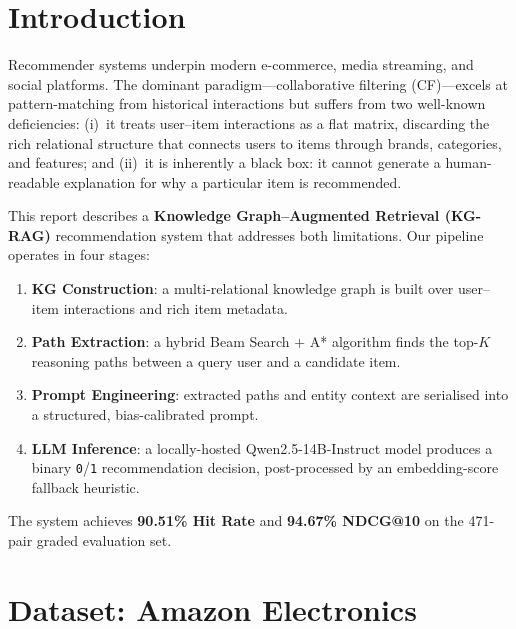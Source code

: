 \documentclass[12pt,a4paper]{article}
\begin{document}
\section{Introduction}

Recommender systems underpin modern e-commerce, media streaming, and social platforms.
The dominant paradigm---collaborative filtering (CF)---excels at pattern-matching from
historical interactions but suffers from two well-known deficiencies:
(i)~it treats user--item interactions as a flat matrix, discarding the rich relational
structure that connects users to items through brands, categories, and features; and
(ii)~it is inherently a black box: it cannot generate a human-readable explanation for
why a particular item is recommended.

This report describes a \textbf{Knowledge Graph--Augmented Retrieval (KG-RAG)}
recommendation system that addresses both limitations.
Our pipeline operates in four stages:

\begin{enumerate}[leftmargin=2em]
  \item \textbf{KG Construction}: a multi-relational knowledge graph is built over
        user--item interactions and rich item metadata.
  \item \textbf{Path Extraction}: a hybrid Beam Search $+$ A* algorithm finds the
        top-$K$ reasoning paths between a query user and a candidate item.
  \item \textbf{Prompt Engineering}: extracted paths and entity context are serialised
        into a structured, bias-calibrated prompt.
  \item \textbf{LLM Inference}: a locally-hosted Qwen2.5-14B-Instruct model produces a
        binary \texttt{0}/\texttt{1} recommendation decision, post-processed by an
        embedding-score fallback heuristic.
\end{enumerate}

The system achieves \textbf{90.51\% Hit Rate} and \textbf{94.67\% NDCG@10}
on the 471-pair graded evaluation set.

\section{Dataset: Amazon Electronics}
\label{sec:dataset}
\end{document}
